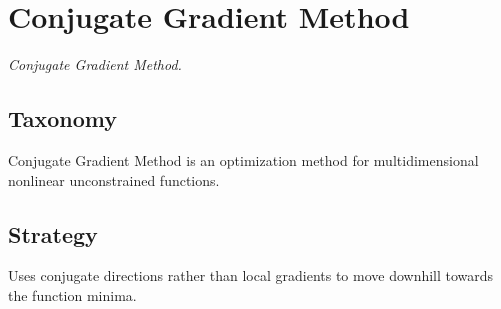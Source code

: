 
\section{Conjugate Gradient Method} 
\label{sec:conjugate_gradient}

\emph{Conjugate Gradient Method.}

\subsection{Taxonomy}
Conjugate Gradient Method is an optimization method for multidimensional nonlinear unconstrained functions.

\subsection{Strategy}

Uses conjugate directions rather than local gradients to move downhill towards the function minima. 


